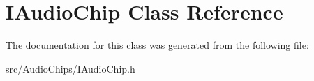 \hypertarget{classIAudioChip}{}\section{I\+Audio\+Chip Class Reference}
\label{classIAudioChip}


The documentation for this class was generated from the following file\+:\begin{DoxyCompactItemize}
\item 
src/\+Audio\+Chips/I\+Audio\+Chip.\+h\end{DoxyCompactItemize}
